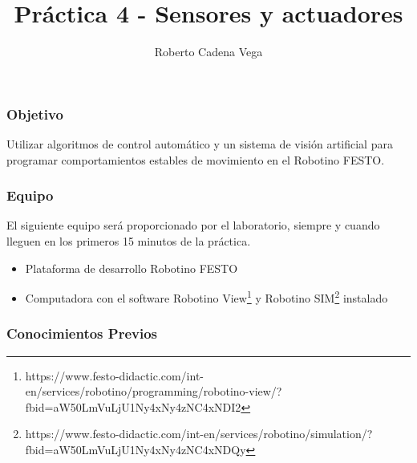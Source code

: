 
\let\oldfootnotesize\footnotesize
\renewcommand*{\footnotesize}{\oldfootnotesize\tiny}
\title{Práctica 4 - Sensores y actuadores}
\author{Roberto Cadena Vega}
\date{}

\beamertemplatenavigationsymbolsempty
\maketitle
\begin{frame}
	\frametitle{Objetivo}
	Utilizar algoritmos de control automático y un sistema de visión artificial para programar comportamientos estables de movimiento en el Robotino FESTO.
\end{frame}
\begin{frame}
	\frametitle{Equipo}
	El siguiente equipo será proporcionado por el laboratorio, siempre y cuando lleguen en los primeros 15 minutos de la práctica.
	\begin{itemize}
		\item Plataforma de desarrollo Robotino FESTO
		\item Computadora con el software Robotino View\footnote{https://www.festo-didactic.com/int-en/services/robotino/programming/robotino-view/?fbid=aW50LmVuLjU1Ny4xNy4zNC4xNDI2} y Robotino SIM\footnote{https://www.festo-didactic.com/int-en/services/robotino/simulation/?fbid=aW50LmVuLjU1Ny4xNy4zNC4xNDQy} instalado
	\end{itemize}
\end{frame}
\begin{frame}
	\frametitle{Conocimientos Previos}
\end{frame}

